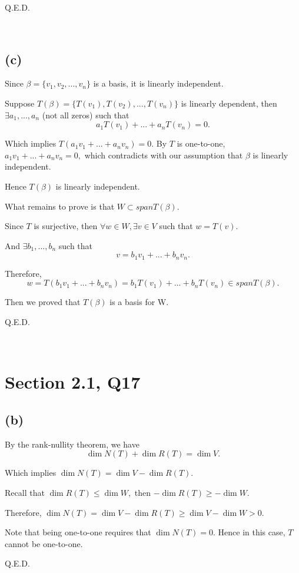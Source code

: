 \documentclass[12pt]{article}%
\begin{document}
Q.E.D. 

~ \ 

\subsection{(c)}

Since $\beta=\{v_1,v_2,...,v_n\}$ is a basis, it is linearly independent. 

Suppose $T(\beta)=\{T(v_1),T(v_2),...,T(v_n)\}$ is linearly dependent, then $\exists a_1,...,a_n$ (not all zeros) such that $$a_1T(v_1)+...+a_nT(v_n)=0.$$

Which implies $T(a_1v_1+...+a_nv_n)=0.$ By $T$ is one-to-one, $a_1v_1+...+a_nv_n=0,$ which contradicts with our assumption that $\beta$ is linearly independent.

Hence $T(\beta)$ is linearly independent.

What remains to prove is that $W\subset span{T(\beta)}.$ 

Since $T$ is surjective, then $\forall w\in W, \exists v\in V$ such that $w=T(v).$ 

And $\exists b_1,...,b_n $ such that $$v=b_1v_1+...+b_nv_n.$$ 

Therefore, $$w=T(b_1v_1+...+b_nv_n)=b_1T(v_1)+...+b_nT(v_n)\in span{T(\beta)}.$$ 

Then we proved that $T(\beta)$ is a basis for W.

Q.E.D. 

~\ 



\section{Section 2.1, Q17}

\subsection{(b)}

By the rank-nullity theorem, we have $$\dim{N(T)}+\dim{R(T)}=\dim{V}.$$ 

Which implies $\dim{N(T)}=\dim{V}-\dim{R(T)}.$

Recall that $\dim{R(T)}\leq\dim{W},$ then $-\dim{R(T)}\geq-\dim{W}.$ 

Therefore, $\dim{N(T)}=\dim{V}-\dim{R(T)}\geq \dim{V}-\dim{W}>0.$ 

Note that being one-to-one requires that $\dim{N(T)}=0.$ Hence in this case, $T$ cannot be one-to-one.

Q.E.D. 
\end{document}
